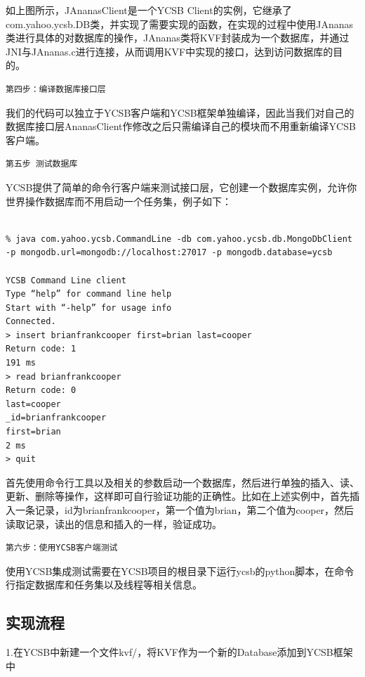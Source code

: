 		如上图所示，JAnanasClient是一个YCSB Client的实例，它继承了com.yahoo.ycsb.DB类，并实现了需要实现的函数，在实现的过程中使用JAnanas类进行具体的对数据库的操作，JAnanas类将KVF封装成为一个数据库，并通过JNI与JAnanas.c进行连接，从而调用KVF中实现的接口，达到访问数据库的目的。		

		\begin{Verbatim}[frame = none]
    第四步：编译数据库接口层
		\end{Verbatim}

		我们的代码可以独立于YCSB客户端和YCSB框架单独编译，因此当我们对自己的数据库接口层AnanasClient作修改之后只需编译自己的模块而不用重新编译YCSB客户端。


		\begin{Verbatim}[frame = none]
    第五步 测试数据库	
		\end{Verbatim}

		YCSB提供了简单的命令行客户端来测试接口层，它创建一个数据库实例，允许你世界操作数据库而不用启动一个任务集，例子如下：

\begin{Verbatim}[frame = single]

% java com.yahoo.ycsb.CommandLine -db com.yahoo.ycsb.db.MongoDbClient 
-p mongodb.url=mongodb://localhost:27017 -p mongodb.database=ycsb

YCSB Command Line client
Type “help” for command line help
Start with “-help” for usage info
Connected.
> insert brianfrankcooper first=brian last=cooper
Return code: 1
191 ms
> read brianfrankcooper
Return code: 0
last=cooper
_id=brianfrankcooper
first=brian
2 ms
> quit
\end{Verbatim}

		首先使用命令行工具以及相关的参数启动一个数据库，然后进行单独的插入、读、更新、删除等操作，这样即可自行验证功能的正确性。比如在上述实例中，首先插入一条记录，id为brianfrankcooper，第一个值为brian，第二个值为cooper，然后读取记录，读出的信息和插入的一样，验证成功。


		\begin{Verbatim}[frame = none]
	第六步：使用YCSB客户端测试
		\end{Verbatim}

		使用YCSB集成测试需要在YCSB项目的根目录下运行ycsb的python脚本，在命令行指定数据库和任务集以及线程等相关信息。

	\subsection{实现流程}

	1.在YCSB中新建一个文件kvf/，将KVF作为一个新的Database添加到YCSB框架中

